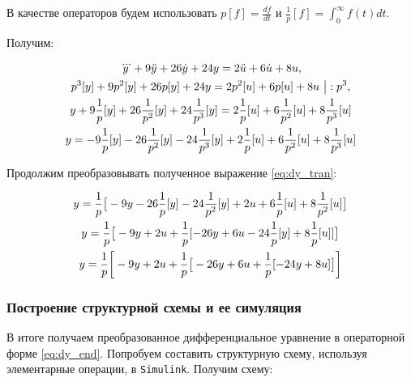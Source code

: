 \documentclass[a4paper,14pt,oneside,openany]{article}
\theoremstyle{definition}
\theoremstyle{plain}
\theoremstyle{remark}
\begin{document}
В качестве операторов будем использовать $p[f] = \frac{df}{dt}$ и $\frac{1}{p}[f] = \int_{0}^{\infty} f(t)dt$. 

Получим:

\begin{gather}
	\notag
	\dddot{y} + 9\ddot{y} + 26\dot{y} + 24y = 2\ddot{u} + 6\dot{u} + 8u,\\
	\notag
	p^3[y] + 9p^2[y] + 26p[y] + 24y = 2p^2[u] + 6p[u] + 8u\ \big| : p^3,\\
	\notag
	y + 9\frac{1}{p}[y] + 26\frac{1}{p^2}[y] + 24\frac{1}{p^3}[y] = 2\frac{1}{p}[u] + 6\frac{1}{p^2}[u] + 8\frac{1}{p^3}[u]\\
	\label{eq:dy_tran}
	y = - 9\frac{1}{p}[y] - 26\frac{1}{p^2}[y] - 24\frac{1}{p^3}[y] + 2\frac{1}{p}[u] + 6\frac{1}{p^2}[u] + 8\frac{1}{p^3}[u]
\end{gather}

Продолжим преобразовывать полученное выражение \eqref{eq:dy_tran}:

\begin{gather}
	\notag
	y = \frac{1}{p}\big[-9y - 26\frac{1}{p}[y] - 24\frac{1}{p^2}[y] + 2u + 6\frac{1}{p}[u] + 8\frac{1}{p^2}[u] \big]\\
	\notag
	y = \frac{1}{p}\big[-9y + 2u + \frac{1}{p}[ -26y + 6u - 24\frac{1}{p}[y] + 8\frac{1}{p}[u]] \big]\\
	\label{eq:dy_end}
	y = \frac{1}{p} \bigg[-9y + 2u + \frac{1}{p} \big[ -26y + 6u + \frac{1}{p}[-24y + 8u] \big] \bigg]
\end{gather}

\subsubsection{Построение структурной схемы и ее симуляция}

В итоге получаем преобразованное дифференциальное уравнение в операторной форме \eqref{eq:dy_end}. Попробуем составить 
структурную схему, используя элементарные операции, в \texttt{Simulink}. Получим схему: 



\end{document}
